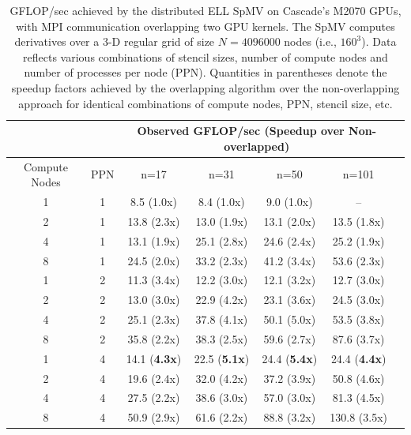 \begin{table}[h]
\centering
\caption{GFLOP/sec achieved by the distributed ELL SpMV on Cascade's M2070 GPUs, with MPI communication overlapping two GPU kernels. The SpMV computes derivatives over a 3-D regular grid of size $N=4096000$ nodes (i.e., $160^3$). Data reflects various combinations of stencil sizes, number of compute nodes and number of processes per node (PPN). Quantities in parentheses denote the speedup factors achieved by the overlapping algorithm over the non-overlapping approach for identical combinations of compute nodes, PPN, stencil size, etc. }
\label{tbl:cascade_m2070_overlap}
\begin{tabular}{c|c|c|c|c|c|c}
 \multicolumn{2}{c}{ } & \multicolumn{4}{|c|}{Observed GFLOP/sec (Speedup over Non-overlapped)} \\  \hline
Compute Nodes   &   PPN  &   n=17   &   n=31   &   n=50   &   n=101   \\ \hline
1   &   1   &   8.5 (1.0x)   &   8.4 (1.0x)   &   9.0 (1.0x)   &  --    \\
2   &   1   &   13.8 (2.3x)   &   13.0 (1.9x)   &   13.1 (2.0x)   &   13.5 (1.8x)   \\
4   &   1   &   13.1 (1.9x)   &   25.1 (2.8x)   &   24.6 (2.4x)   &   25.2 (1.9x)   \\
8   &   1   &   24.5 (2.0x)   &   33.2 (2.3x)   &   41.2 (3.4x)   &   53.6 (2.3x)   \\ \hline
1   &   2   &   11.3 (3.4x)   &   12.2 (3.0x)   &   12.1 (3.2x)   &   12.7 (3.0x)   \\
2   &   2   &   13.0 (3.0x)   &   22.9 (4.2x)   &   23.1 (3.6x)   &   24.5 (3.0x)   \\
4   &   2   &   25.1 (2.3x)   &   37.8 (4.1x)   &   50.1 (5.0x)   &   53.5 (3.8x)   \\
8   &   2   &   35.8 (2.2x)   &   38.3 (2.5x)   &   59.6 (2.7x)   &   87.6 (3.7x)   \\ \hline
1   &   4   &   14.1 (\textbf{4.3x})   &   22.5 (\textbf{5.1x})   &   24.4 (\textbf{5.4x})   &   24.4 (\textbf{4.4x})   \\
2   &   4   &   19.6 (2.4x)   &   32.0 (4.2x)   &   37.2 (3.9x)   &   50.8 (4.6x)   \\
4   &   4   &   27.5 (2.2x)   &   38.6 (3.0x)   &   57.0 (3.0x)   &   81.3 (4.5x)   \\
8   &   4   &   50.9 (2.9x)   &   61.6 (2.2x)   &   88.8 (3.2x)   &   130.8 (3.5x)  
\end{tabular} 
\end{table}

